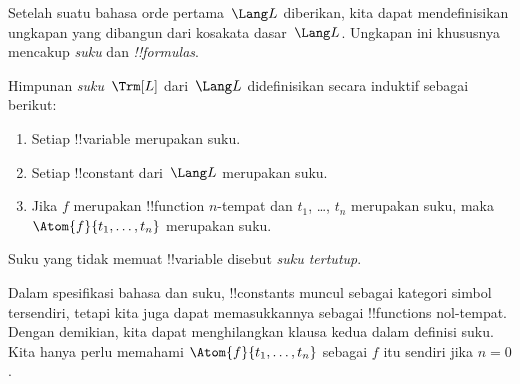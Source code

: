 \documentclass[../../../include/open-logic-section]{subfiles}
\begin{document}


Setelah suatu bahasa orde pertama~$\Lang L$ diberikan, kita dapat
mendefinisikan ungkapan yang dibangun dari kosakata dasar~$\Lang L$.
Ungkapan ini khususnya mencakup \emph{suku} dan \emph{!!{formula}s}.

\begin{defn}[Suku]
Himpunan \emph{suku}~$\Trm[L]$ dari~$\Lang L$ didefinisikan secara
induktif sebagai berikut:
\begin{enumerate}
\item Setiap !!{variable} merupakan suku.
\item Setiap !!{constant} dari~$\Lang L$ merupakan suku.
\item Jika $f$ merupakan !!{function} $n$-tempat dan $t_1$, \dots, $t_n$
  merupakan suku, maka $\Atom{f}{t_1, \ldots, t_n}$ merupakan suku.
\end{enumerate}
Suku yang tidak memuat !!{variable} disebut \emph{suku tertutup}.
\end{defn}

\begin{explain}
Dalam spesifikasi bahasa dan suku, !!{constant}s muncul sebagai kategori
simbol tersendiri, tetapi kita juga dapat memasukkannya sebagai !!{function}s
nol-tempat. Dengan demikian, kita dapat menghilangkan klausa kedua dalam
definisi suku. Kita hanya perlu memahami $\Atom{f}{t_1, \ldots, t_n}$
sebagai $f$ itu sendiri jika $n = 0$.
\end{explain}
\end{document}

